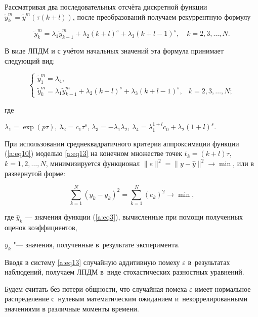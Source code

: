 Рассматривая два последовательных отсчёта дискретной функции $\tilde{y}^m_k=\tilde{y}^m(\tau (k+l))$, после преобразований получаем рекуррентную формулу

$$

\tilde{y}^m_k= \lambda_1\tilde{y}^m_{k-1}+\lambda_2 (k+l)^s +\lambda_3(k+l-1)^s ,\quad  k=2, 3, \dots , N. 

$$

В виде ЛПДМ и с учётом начальных значений эта формула принимает следующий вид:

\begin{equation}\label{a:eq13}

\left\{ 

\begin{array}{ll}

\tilde{y}^m_1= \lambda_4, 	\\

\tilde{y}^m_k= \lambda_1 \tilde{y}^m_{k-1}+\lambda_2 (k+l)^s +\lambda_3(k+l-1)^s , & k=2, 3, \dots, N ;

\end{array}

\right.

\end{equation}

где 

$\lambda_1=\exp(p\tau)$, $\lambda_2=c_1 \tau^s$, $\lambda_3=-\lambda_1 \lambda_2$, $\lambda_4=\lambda_1 ^{1+l} c_0 + \lambda_2 (1+l)^s$.

При использовании среднеквадратичного критерия аппроксимации \cite{a:Z} функции (\ref{a:eq10})  моделью \eqref{a:eq13} на конечном множестве точек  $t_k=(k+l)\tau$, $k=1, 2, \dots, N $,  минимизируется функционал $ \|e\| ^{2}=\|y-\hat{y}\| ^{2}\to \min $, или в развернутой форме:

$$

\sum_{k=1}^{N}(y_k-\hat{y}_k)^2= \sum_{k=1}^{N}(e_k)^2 \to \min ,

$$

где $\hat{y}_k$ --- значения функции (\ref{a:eq3}), вычисленные при помощи полученных оценок коэффициентов,

${y}_k$ "--- значения, полученные в~результате эксперимента. 



Вводя в систему \eqref{a:eq13} случайную аддитивную помеху $\varepsilon$ в~результатах наблюдений, получаем ЛПДМ в~виде стохастических разностных уравнений. 

Будем считать без потери общности, что случайная помеха $\varepsilon$ имеет нормальное распределение с~нулевым математическим ожиданием и~некоррелированными значениями в различные моменты времени. 

